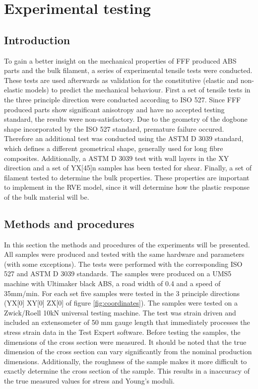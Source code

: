 \chapter{Experimental testing}
\label{chp:5}

\graphicspath{{chapter_5_Experimentaltesting/figures}}

\section{Introduction}
To gain a better insight on the mechanical properties of FFF produced ABS parts and the bulk filament, a series of experimental tensile tests were conducted. These tests are used afterwards as validation for the constitutive (elastic and non-elastic models) to predict the mechanical behaviour. First a set of tensile tests in the three principle direction were conducted according to ISO 527\cite{De2013NEN-EN-ISO527-4}\cite{Afd2016NEN-EN-ISO527-2}. Since FFF produced parts show significant anisotropy and have no accepted testing standard, the results were non-satisfactory. Due to the geometry of the dogbone shape incorporated by the ISO 527 standard, premature failure occured. Therefore an additional test was conducted using the ASTM D 3039 \cite{ASTM2008Standard3039} standard, which defines a different geometrical shape, generally used for long fibre composites. Additionally, a ASTM D 3039 test with wall layers in the XY direction and a set of YX[45]n samples has been tested for shear. Finally, a set of filament tested to determine the bulk properties. These properties are important to implement in the RVE model, since it will determine how the plastic response of the bulk material will be. 

\section{Methods and procedures}
In this section the methods and procedures of the experiments will be presented. All samples were produced and tested with the same hardware and parameters (with some exceptions). The tests were performed with the corresponding ISO 527 and ASTM D 3039 standards.
The samples were produced on a UMS5 machine with Ultimaker black ABS\cite{Ultimaker2018TechnicalABS}, a road width of 0.4 and a speed of 35mm/min. For each set five samples were tested in the 3 principle directions (YX[0] XY[0] ZX[0] of figure \ref{fig:coordinates}). The samples were tested on a Zwick/Roell 10kN universal testing machine. The test was strain driven and included an extensometer of 50 mm gauge length that immediately processes the stress strain data in the Test Expert software. Before testing the samples, the dimensions of the cross section were measured. It should be noted that the true dimension of the cross section can vary significantly from the nominal production dimensions. Additionally, the roughness of the sample makes it more difficult to exactly determine the cross section of the sample. This results in a inaccuracy of the true measured values for stress and Young's moduli. 

